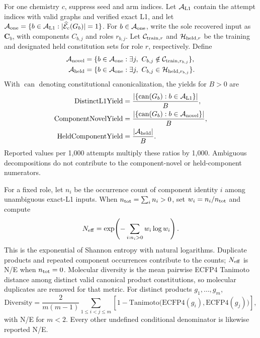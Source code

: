 \documentclass{article}
\theoremstyle{definition}
\begin{document}
For one chemistry $c$, suppress seed and arm indices. Let $\mathcal A_{\rm L1}$ contain the attempt indices
with valid graphs and verified exact L1, and let
$\mathcal A_{\rm one}=\{b\in\mathcal A_{\rm L1}:|\widehat{\mathcal E}_c(G_b)|=1\}$.
For $b\in\mathcal A_{\rm one}$, write the sole recovered input as $\mathbf C_b$, with components $C_{b,j}$
and roles $r_{b,j}$. Let $\mathcal C_{{\rm train},r}$ and $\mathcal H_{{\rm held},r}$ be the
training and designated held constitution sets for role $r$, respectively. Define
\begin{align}
 \mathcal A_{\rm novel}&=\{b\in\mathcal A_{\rm one}:\exists j,\ C_{b,j}\notin\mathcal C_{{\rm train},r_{b,j}}\},\\
 \mathcal A_{\rm held}&=\{b\in\mathcal A_{\rm one}:\exists j,\ C_{b,j}\in\mathcal H_{{\rm held},r_{b,j}}\}.
\end{align}
With $\operatorname{can}$ denoting constitutional canonicalization, the yields for $B>0$ are
\begin{align}
 \mathrm{DistinctL1Yield}&=\frac{|\{\operatorname{can}(G_b):b\in\mathcal A_{\rm L1}\}|}{B},\\
 \mathrm{ComponentNovelYield}&=\frac{|\{\operatorname{can}(G_b):b\in\mathcal A_{\rm novel}\}|}{B},\\
 \mathrm{HeldComponentYield}&=\frac{|\mathcal A_{\rm held}|}{B}.
\end{align}
Reported values per 1,000 attempts multiply these ratios by 1,000. Ambiguous decompositions do not
contribute to the component-novel or held-component numerators.

For a fixed role, let $n_i$ be the occurrence count of component identity $i$ among unambiguous
exact-L1 inputs. When $n_{\rm tot}=\sum_i n_i>0$, set $w_i=n_i/n_{\rm tot}$ and compute
\begin{equation}
 N_{\rm eff}=\exp\!\left(-\sum_{i:n_i>0}w_i\log w_i\right).
\end{equation}
This is the exponential of Shannon entropy with natural logarithms. Duplicate products and repeated
component occurrences contribute to the counts; $N_{\rm eff}$ is N/E when $n_{\rm tot}=0$.
Molecular diversity is the mean pairwise
ECFP4 Tanimoto distance among distinct valid canonical product constitutions, so molecular duplicates
are removed for that metric. For distinct products $g_1,\ldots,g_m$,
\begin{equation}
 \mathrm{Diversity}=
 \frac{2}{m(m-1)}\sum_{1\leq i<j\leq m}
 \left[1-\mathrm{Tanimoto}\bigl(\mathrm{ECFP4}(g_i),\mathrm{ECFP4}(g_j)\bigr)\right],
\end{equation}
with N/E for $m<2$. Every other undefined conditional denominator is likewise reported N/E.
\end{document}
